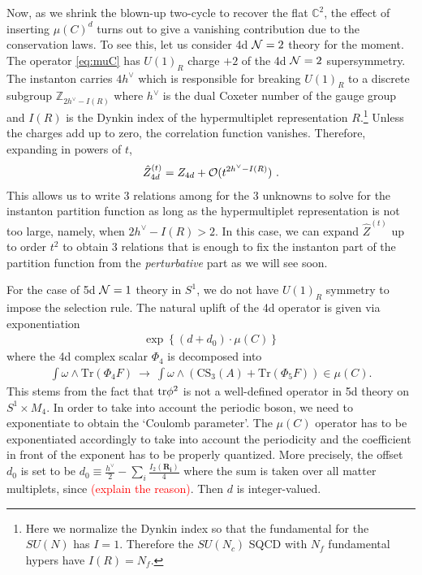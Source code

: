 \documentclass[letterpaper, 11pt]{article}
\def\IC{\mathbb{C}}
\def\IZ{\mathbb{Z}}
\def\CN{{\cal N}}
\def\CO{{\cal O}}
\def\tr{{\rm tr}}
\begin{document}
Now, as we shrink the blown-up two-cycle to recover the flat $\IC^2$, the effect of  inserting $\mu(C)^d$ turns out to give a vanishing contribution due to the conservation laws. 
To see this, let us consider 4d $\CN=2$ theory for the moment. The operator \eqref{eq:muC} has $U(1)_R$ charge $+2$ of the 4d $\CN=2$ supersymmetry. The instanton carries $4h^\vee$ which is responsible for breaking $U(1)_R$ to a discrete subgroup $\IZ_{2h^\vee - I(R)}$ where $h^\vee$ is the dual Coxeter number of the gauge group and $I(R)$ is the Dynkin index of the hypermultiplet representation $R$.\footnote{Here we normalize the Dynkin index so that the fundamental for the $SU(N)$ has $I=1$. Therefore the $SU(N_c)$ SQCD with $N_f$ fundamental hypers have $I(R) = N_f$.} Unless the charges add up to zero, the correlation function vanishes. Therefore, expanding in powers of $t$, 
\begin{align}
\hat{Z}_{4d}^{(t)} = Z_{4d} + \CO(t^{2h^\vee - I(R)})  \ . 
\end{align}
This allows us to write 3 relations among for the 3 unknowns to solve for the instanton partition function as long as the hypermultiplet representation is not too large, namely, when $2h^\vee - I(R) > 2$. In this case, we can expand $\hat{Z}^{(t)}$ up to order $t^2$ to obtain 3 relations that is enough to fix the instanton part of the partition function from the \emph{perturbative} part as we will see soon. 

For the case of 5d $\CN=1$ theory in $S^1$, we do not have $U(1)_R$ symmetry to impose the selection rule. The natural uplift of the 4d operator 
is given via exponentiation  \cite{Baulieu:1997nj}
\begin{align}
  \exp{ \left\{(d+d_0)\cdot  \mu (C)\right\} }
\end{align}
where the 4d complex scalar $\Phi_4$ is decomposed into
\begin{align}
  \int\omega \wedge \text{Tr}(\Phi_4 F) \ \longrightarrow \
  \int\omega \wedge \left(\text{CS}_3(A) + \text{Tr}(\Phi_5 F) \right) \in \mu(C).
\end{align}
This stems from the fact that $\tr \phi^2$ is not a well-defined operator in 5d theory on $S^1 \times M_4$. In order to take into account the periodic boson, we need to exponentiate to obtain the `Coulomb parameter'. The $\mu(C)$ operator has to be exponentiated accordingly to take into account the periodicity and the coefficient in front of the exponent has to be properly quantized. More precisely, the offset $d_0$ is set to be $d_0 \equiv \frac{h^\vee}{2} - \sum_{i} \frac{I_2(\mathbf{R_i})}{4}$ where the sum is taken over all matter multiplets, since \textcolor{red}{(explain the reason)}. Then $d$ is integer-valued.  
\end{document}
